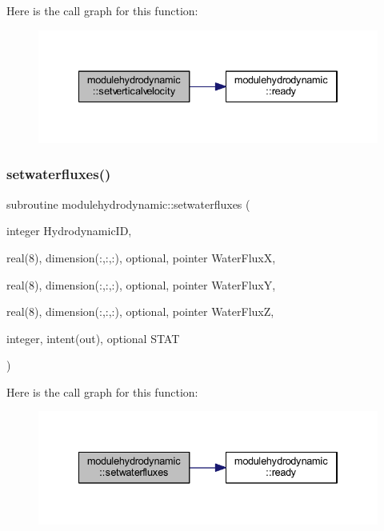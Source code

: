Here is the call graph for this function\+:\nopagebreak
\begin{figure}[H]
\begin{center}
\leavevmode
\includegraphics[width=334pt]{namespacemodulehydrodynamic_a0ed7fd6441646298396381636f172534_cgraph}
\end{center}
\end{figure}
\mbox{\label{namespacemodulehydrodynamic_a6c2c32efe21be75b5ffccf7b9d4dbcdb}} 
\subsubsection{\texorpdfstring{setwaterfluxes()}{setwaterfluxes()}}
{\footnotesize\ttfamily subroutine modulehydrodynamic\+::setwaterfluxes (\begin{DoxyParamCaption}\item[{integer}]{Hydrodynamic\+ID,  }\item[{real(8), dimension(\+:,\+:,\+:), optional, pointer}]{Water\+FluxX,  }\item[{real(8), dimension(\+:,\+:,\+:), optional, pointer}]{Water\+FluxY,  }\item[{real(8), dimension(\+:,\+:,\+:), optional, pointer}]{Water\+FluxZ,  }\item[{integer, intent(out), optional}]{S\+T\+AT }\end{DoxyParamCaption})\hspace{0.3cm}{\ttfamily [private]}}

Here is the call graph for this function\+:\nopagebreak
\begin{figure}[H]
\begin{center}
\leavevmode
\includegraphics[width=334pt]{namespacemodulehydrodynamic_a6c2c32efe21be75b5ffccf7b9d4dbcdb_cgraph}
\end{center}
\end{figure}
\mbox{\label{namespacemodulehydrodynamic_ac429c4fc2329d56d285f5389d5d57e55}} 
